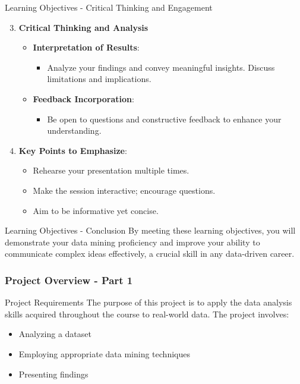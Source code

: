 \documentclass[aspectratio=169]{beamer}
\begin{document}
\begin{frame}[fragile]{Learning Objectives - Critical Thinking and Engagement}
    \begin{enumerate}
        \setcounter{enumi}{2} %
        \item \textbf{Critical Thinking and Analysis}
            \begin{itemize}
                \item \textbf{Interpretation of Results}:
                    \begin{itemize}
                        \item Analyze your findings and convey meaningful insights. Discuss limitations and implications.
                    \end{itemize}
                \item \textbf{Feedback Incorporation}:
                    \begin{itemize}
                        \item Be open to questions and constructive feedback to enhance your understanding.
                    \end{itemize}
            \end{itemize}
        \item \textbf{Key Points to Emphasize}:
            \begin{itemize}
                \item {} Rehearse your presentation multiple times.
                \item {} Make the session interactive; encourage questions.
                \item {} Aim to be informative yet concise.
            \end{itemize}
    \end{enumerate}
\end{frame}

\begin{frame}[fragile]{Learning Objectives - Conclusion}
    By meeting these learning objectives, you will demonstrate your data mining proficiency and improve your ability to communicate complex ideas effectively, a crucial skill in any data-driven career.
\end{frame}

\begin{frame}[fragile]
    \frametitle{Project Overview - Part 1}
    
    \begin{block}{Project Requirements}
    The purpose of this project is to apply the data analysis skills acquired throughout the course to real-world data. The project involves:
    \begin{itemize}
        \item Analyzing a dataset
        \item Employing appropriate data mining techniques
        \item Presenting findings
    \end{itemize}
    \end{block}
\end{frame}
\end{document}
